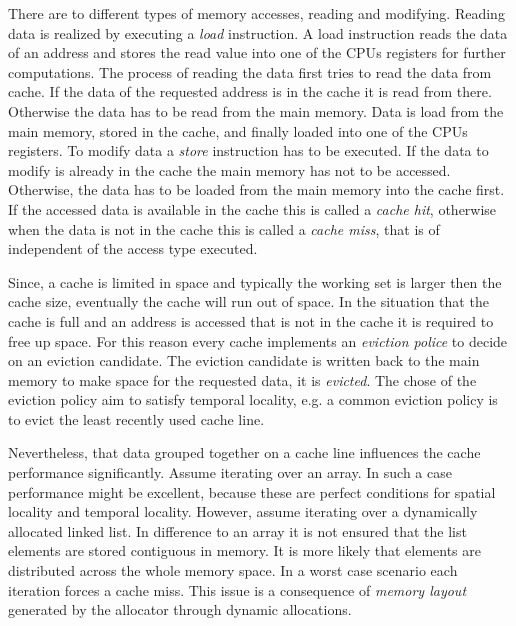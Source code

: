 \documentclass[onecolumn, openright, master, english, signatures]{dbrgrptt}
\begin{document}
There are to different types of memory accesses, reading and modifying. Reading data is realized by executing a \emph{load} instruction. A load instruction reads the data of an address and stores the read value into one of the \ac{CPU}s registers for further computations. The process of reading the data first tries to read the data from cache. If the data of the requested address is in the cache it is read from there. Otherwise the data has to be read from the main memory. Data is load from the main memory, stored in the cache, and finally loaded into one of the \ac{CPU}s registers. To modify data a \emph{store} instruction has to be executed. If the data to modify is already in the cache the main memory has not to be accessed. Otherwise, the data has to be loaded from the main memory into the cache first. If the accessed data is available in the cache this is called a \emph{cache hit}, otherwise when the data is not in the cache this is called a \emph{cache miss}, that is of independent of the access type executed.

Since, a cache is limited in space and typically the working set is larger then the cache size, eventually the cache will run out of space. In the situation that the cache is full and an address is accessed that is not in the cache it is required to free up space. For this reason every cache implements an \emph{eviction police} to decide on an eviction candidate. The eviction candidate is written back to the main memory to make space for the requested data, it is \emph{evicted}. The chose of the eviction policy aim to satisfy temporal locality, e.g. a common eviction policy is to evict the least recently used cache line.

Nevertheless, that data grouped together on a cache line influences the cache performance significantly. Assume iterating over an array. In such a case performance might be excellent, because these are perfect conditions for spatial locality and temporal locality. However, assume iterating over a dynamically allocated linked list. In difference to an array it is not ensured that the list elements are stored contiguous in memory. It is more likely that elements are distributed across the whole memory space. In a worst case scenario each iteration forces a cache miss. This issue is a consequence of \emph{memory layout} generated by the allocator through dynamic allocations.
\end{document}
